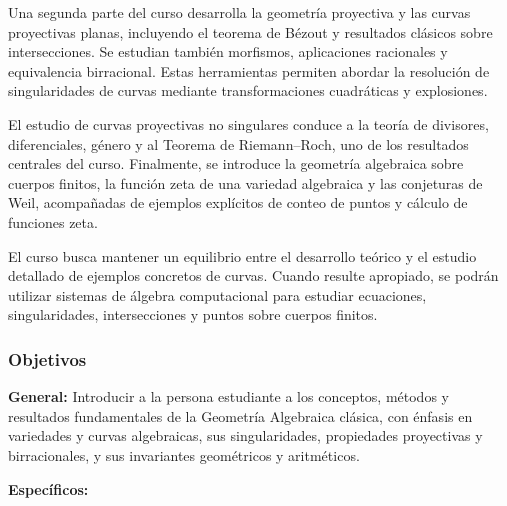 \begin{refsection}
Una segunda parte del curso desarrolla la geometría proyectiva y las curvas proyectivas planas, incluyendo el teorema de Bézout y resultados clásicos sobre intersecciones. Se estudian también morfismos, aplicaciones racionales y equivalencia birracional. Estas herramientas permiten abordar la resolución de singularidades de curvas mediante transformaciones cuadráticas y explosiones.

El estudio de curvas proyectivas no singulares conduce a la teoría de divisores, diferenciales, género y al Teorema de Riemann--Roch, uno de los resultados centrales del curso. Finalmente, se introduce la geometría algebraica sobre cuerpos finitos, la función zeta de una variedad algebraica y las conjeturas de Weil, acompañadas de ejemplos explícitos de conteo de puntos y cálculo de funciones zeta.

El curso busca mantener un equilibrio entre el desarrollo teórico y el estudio detallado de ejemplos concretos de curvas. Cuando resulte apropiado, se podrán utilizar sistemas de álgebra computacional para estudiar ecuaciones, singularidades, intersecciones y puntos sobre cuerpos finitos.

\subsubsection*{Objetivos}

\textbf{General:} Introducir a la persona estudiante a los conceptos, métodos y resultados fundamentales de la Geometría Algebraica clásica, con énfasis en variedades y curvas algebraicas, sus singularidades, propiedades proyectivas y birracionales, y sus invariantes geométricos y aritméticos. \

\textbf{Específicos:}


\end{refsection}

